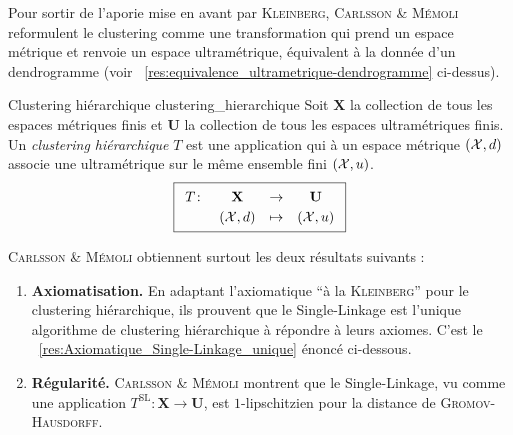 Pour sortir de l'aporie mise en avant par \textsc{Kleinberg}, \textsc{Carlsson \& Mémoli} \cite{CarlssonMemoli2010} reformulent le clustering comme une transformation qui prend un espace métrique et renvoie un espace {ultramétrique}, équivalent à la donnée d'un dendrogramme (voir \Res~\ref{res:equivalence_ultrametrique-dendrogramme} ci-dessus).

\begin{Definition}{Clustering hiérarchique \cite{CarlssonMemoli2010}}{clustering_hierarchique}
    Soit $\mathbf X$ la collection de tous les espaces métriques finis et $\mathbf U$ la collection de tous les espaces ultramétriques finis. Un \emph{clustering hiérarchique} $T$ est une application qui à un espace métrique $(\mathcal{X},d)$ associe une ultramétrique sur le même ensemble fini $(\mathcal{X},u)$.
\[
\boxed{
    \renewcommand{\arraystretch}{1.2} %
    \begin{array}{c c c c}
        T \colon & \mathbf{X} & \to & \mathbf{U} \\
                 & (\X,d) & \mapsto & (\X,u)
    \end{array}
}
\]
\end{Definition}



\textsc{Carlsson \& Mémoli} \cite{CarlssonMemoli2010} obtiennent surtout les deux résultats suivants :
\begin{enumerate}%
    \item \textbf{Axiomatisation.} En adaptant l'axiomatique ``à la \textsc{Kleinberg}'' pour le clustering hiérarchique, ils prouvent que le Single-Linkage est l'unique algorithme de clustering hiérarchique à répondre à leurs axiomes. C'est le \Res~\ref{res:Axiomatique_Single-Linkage_unique} énoncé ci-dessous.
    \item \textbf{Régularité.} \textsc{Carlsson \& Mémoli} montrent que le Single-Linkage, vu comme une application $T^{\mathrm{SL}} : \mathbf X \to \mathbf U$, est $1$-lipschitzien pour la distance de \textsc{Gromov-Hausdorff}.
\end{enumerate}


